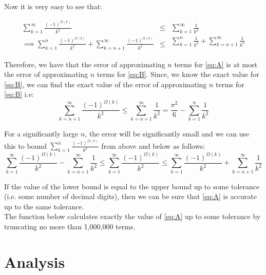 \documentclass[11pt]{report}
\begin{document}
Now it is very easy to see that:

\begin{equation*}
\begin{aligned}\sum_{k=1}^{\infty} \frac{(-1)^{\Omega(k)}}{k^2} &\le{}\\ \implies \sum_{k=1}^{n} \frac{(-1)^{\Omega(k)}}{k^2} + \sum_{k=n+1}^{\infty} \frac{(-1)^{\Omega(k)}}{k^2} &\le{} \end{aligned}\!
\begin{gathered}\sum_{k=1}^{\infty} \frac{1}{k^2}\\ \sum_{k=1}^{n} \frac{1}{k^2} + \sum_{k=n+1}^{\infty} \frac{1}{k^2} \end{gathered}\!
\end{equation*}

Therefore, we have that the error of approximating $n$ terms for \eqref{eq:A} is at most the error of approximating $n$ terms for \eqref{eq:B}. Since, we know the exact value for \eqref{eq:B}, we can find the exact value of the error of approximating $n$ terms for \eqref{eq:B} i.e:
\begin{equation}
	\sum_{k=n+1}^{\infty} \frac{(-1)^{\Omega(k)}}{k^2} \leq \sum_{k=n+1}^{\infty} \frac{1}{k^2} = \frac{\pi^2}{6} - \sum_{k=1}^{n} \frac{1}{k^2}
\end{equation}

For a significantly large $n$, the error will be significantly small and we can use this to bound $\sum\limits_{k=1}^{n} \frac{(-1)^{\Omega(k)}}{k^2}$ from above and below as follows:
\begin{equation}
	\sum_{k=1}^{\infty} \frac{(-1)^{\Omega(k)}}{k^2} - \sum_{k=n+1}^{\infty} \frac{1}{k^2} \leq \sum_{k=1}^{\infty} \frac{(-1)^{\Omega(k)}}{k^2} \leq \sum_{k=1}^{\infty} \frac{(-1)^{\Omega(k)}}{k^2} + \sum_{k=n+1}^{\infty} \frac{1}{k^2} \label{eq:bounds}
\end{equation}

If the value of the lower bound is equal to the upper bound up to some tolerance (i.e. some number of decimal digits), then we can be sure that \eqref{eq:A} is accurate up to the same tolerance. \\

The function below calculates exactly the value of \eqref{eq:A} up to some tolerance by truncating no more than 1,000,000 terms. \\



\section{Analysis}
\end{document}
